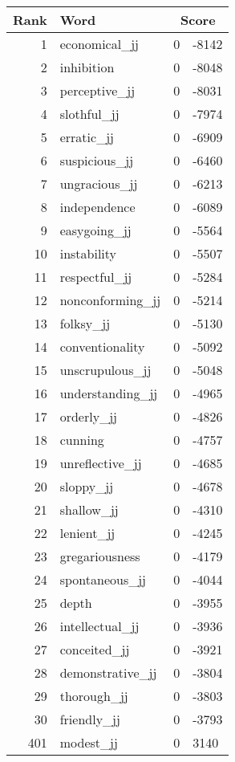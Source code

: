 \begin{longtable}[!htbp]{| rlr@{.}l |}
    \hline
    \textbf{Rank} & \textbf{Word} & \multicolumn{2}{c|}{\textbf{Score}} \\
    \hline
    \endhead
    1 & economical\_jj & 0 & -8142 \\
    2 & inhibition & 0 & -8048 \\
    3 & perceptive\_jj & 0 & -8031 \\
    4 & slothful\_jj & 0 & -7974 \\
    5 & erratic\_jj & 0 & -6909 \\
    6 & suspicious\_jj & 0 & -6460 \\
    7 & ungracious\_jj & 0 & -6213 \\
    8 & independence & 0 & -6089 \\
    9 & easygoing\_jj & 0 & -5564 \\
    10 & instability & 0 & -5507 \\
    11 & respectful\_jj & 0 & -5284 \\
    12 & nonconforming\_jj & 0 & -5214 \\
    13 & folksy\_jj & 0 & -5130 \\
    14 & conventionality & 0 & -5092 \\
    15 & unscrupulous\_jj & 0 & -5048 \\
    16 & understanding\_jj & 0 & -4965 \\
    17 & orderly\_jj & 0 & -4826 \\
    18 & cunning & 0 & -4757 \\
    19 & unreflective\_jj & 0 & -4685 \\
    20 & sloppy\_jj & 0 & -4678 \\
    21 & shallow\_jj & 0 & -4310 \\
    22 & lenient\_jj & 0 & -4245 \\
    23 & gregariousness & 0 & -4179 \\
    24 & spontaneous\_jj & 0 & -4044 \\
    25 & depth & 0 & -3955 \\
    26 & intellectual\_jj & 0 & -3936 \\
    27 & conceited\_jj & 0 & -3921 \\
    28 & demonstrative\_jj & 0 & -3804 \\
    29 & thorough\_jj & 0 & -3803 \\
    30 & friendly\_jj & 0 & -3793 \\
    401 & modest\_jj & 0 & 3140 \\

\end{longtable}
